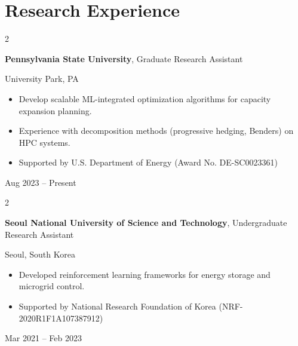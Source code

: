 \documentclass[10pt, letterpaper]{article}
\newenvironment{highlights}{
    \begin{itemize}[
        topsep=0.10 cm,
        parsep=0.10 cm,
        partopsep=0pt,
        itemsep=0pt,
        leftmargin=0.4 cm + 10pt
    ]
}{
    \end{itemize}
} %
\newenvironment{twocolentry}[2][]{
    \onecolentry
    \def\secondColumn{#2}
    \setcolumnwidth{\fill, 3.4 cm}
    \begin{paracol}{2}
}{
    \switchcolumn \raggedleft \secondColumn
    \end{paracol}
    \endonecolentry
} %
\begin{document}
\section{Research Experience}

\begin{twocolentry}{Aug 2023 – Present}
    \textbf{Pennsylvania State University}, Graduate Research Assistant
    
    University Park, PA
    \begin{highlights}
        \item Develop scalable ML-integrated optimization algorithms for capacity expansion planning.
        \item Experience with decomposition methods (progressive hedging, Benders) on HPC systems.
        \item Supported by U.S. Department of Energy (Award No. DE-SC0023361)
    \end{highlights}
\end{twocolentry}

\vspace{0.2 cm}

\begin{twocolentry}{
    Mar 2021 – Feb 2023
}
    \textbf{Seoul National University of Science and Technology}, Undergraduate Research Assistant
    
    Seoul, South Korea
    \begin{highlights}
    \item Developed reinforcement learning frameworks for energy storage and microgrid control.
    \item Supported by National Research Foundation of Korea (NRF-2020R1F1A107387912)
\end{highlights}
\end{twocolentry}

\vspace{-4pt}
        
\end{document}
